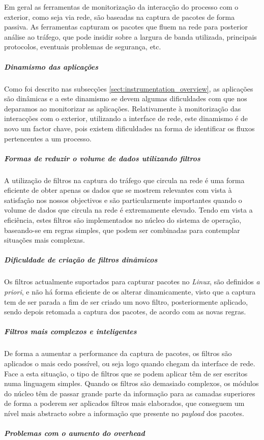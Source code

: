 Em geral as ferramentas de monitorização da interacção do processo com o exterior, como seja via rede, são baseadas na captura de pacotes de forma passiva.
As ferramentas capturam os pacotes que fluem na rede para posterior análise ao tráfego, que pode insidir sobre a largura de banda utilizada, principais protocolos, eventuais problemas de segurança, etc.

\subparagraph*{Dinamismo das aplicações}
Como foi descrito nas subsecções \ref{sect:instrumentation_overview}, as aplicações são dinâmicas e a este dinamismo se devem algumas dificuldades com que nos deparamos ao monitorizar as aplicações.
Relativamente à monitorização das interacções com o exterior, utilizando a interface de rede, este dinamismo é de novo um factor chave, pois existem dificuldades na forma de identificar os fluxos pertencentes a um processo.

\subparagraph*{Formas de reduzir o volume de dados utilizando filtros}
A utilização de filtros  na captura do tráfego que circula na rede é uma forma eficiente de obter apenas os dados que se mostrem relevantes com vista à satisfação nos nossos objectivos e são particularmente importantes quando o volume de dados que circula na rede é extremamente elevado.
Tendo em vista a eficiência, estes filtros são implementados no núcleo do sistema de operação, baseando-se em regras simples, que podem ser combinadas para contemplar situações mais complexas.

\subparagraph*{Dificuldade de criação de filtros dinâmicos}
Os filtros actualmente suportados para capturar pacotes no \textit{Linux}, são definidos \textit{a priori}, e não há forma eficiente de os alterar dinamicamente, visto que a captura tem de ser parada a fim de ser criado um novo filtro, posteriormente aplicado, sendo depois retomada a captura dos pacotes, de acordo com as novas regras.

\subparagraph*{Filtros mais complexos e inteligentes}
De forma a aumentar a performance da captura de pacotes, os filtros são aplicados o mais cedo possível, ou seja logo quando chegam da interface de rede.
Face a esta situação, o tipo de filtros que se podem aplicar têm de ser escritos numa linguagem simples.
Quando os filtros são demasiado complexos, os módulos do núcleo têm de passar grande parte da informação para as camadas superiores de forma a poderem ser aplicados filtros mais elaborados, que conseguem um nível mais abstracto sobre a informação que presente no \textit{payload} dos pacotes.


\subparagraph*{Problemas com o aumento do overhead}

